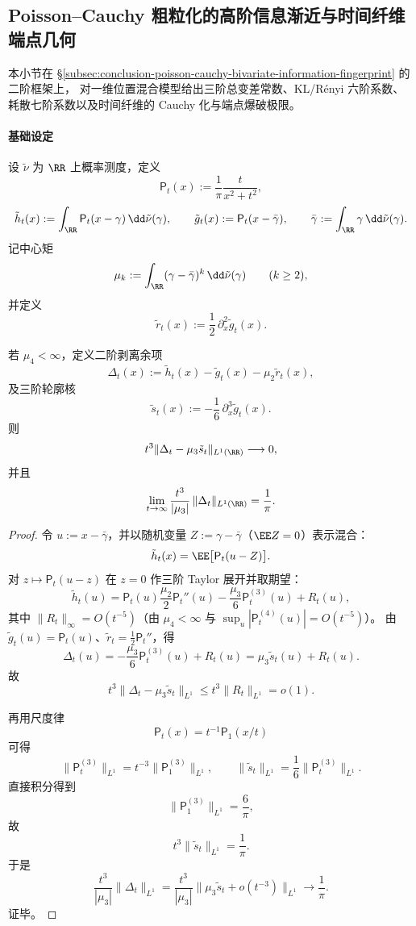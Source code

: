 \subsection{Poisson--Cauchy 粗粒化的高阶信息渐近与时间纤维端点几何}\label{subsec:conclusion-poisson-cauchy-high-order-entropy-fiber-rigidity}
本小节在 \S\ref{subsec:conclusion-poisson-cauchy-bivariate-information-fingerprint} 的二阶框架上，
对一维位置混合模型给出三阶总变差常数、KL/R\'enyi 六阶系数、耗散七阶系数以及时间纤维的 Cauchy 化与端点爆破极限。

\paragraph{基础设定}
设 \(\tilde\nu\) 为 \(\RR\) 上概率测度，定义
\[
\mathsf P_t(x):=\frac1\pi\frac{t}{x^2+t^2},
\]
\[
\tilde h_t(x):=\int_{\RR}\mathsf P_t(x-\gamma)\,\dd\tilde\nu(\gamma),\qquad
\tilde g_t(x):=\mathsf P_t(x-\bar\gamma),\qquad
\bar\gamma:=\int_{\RR}\gamma\,\dd\tilde\nu(\gamma).
\]
记中心矩
\[
\mu_k:=\int_{\RR}(\gamma-\bar\gamma)^k\,\dd\tilde\nu(\gamma)\qquad(k\ge 2),
\]
并定义
\[
\tilde r_t(x):=\frac12\,\partial_x^2\tilde g_t(x).
\]

\begin{theorem}[三阶去方差总变差常数]\label{thm:conclusion-poisson-cauchy-third-order-tv-constant}
若 \(\mu_4<\infty\)，定义二阶剥离余项
\[
\Delta_t(x):=\tilde h_t(x)-\tilde g_t(x)-\mu_2\tilde r_t(x),
\]
及三阶轮廓核
\[
\tilde s_t(x):=-\frac16\,\partial_x^3\tilde g_t(x).
\]
则
\[
t^3\|\Delta_t-\mu_3\tilde s_t\|_{L^1(\RR)}\longrightarrow 0,
\]
并且
\[
\lim_{t\to\infty}\frac{t^3}{|\mu_3|}\,\|\Delta_t\|_{L^1(\RR)}=\frac1\pi.
\]
\end{theorem}
\begin{proof}
令 \(u:=x-\bar\gamma\)，并以随机变量 \(Z:=\gamma-\bar\gamma\)（\(\EE Z=0\)）表示混合：
\[
\tilde h_t(x)=\EE\bigl[\mathsf P_t(u-Z)\bigr].
\]
对 \(z\mapsto \mathsf P_t(u-z)\) 在 \(z=0\) 作三阶 Taylor 展开并取期望：
\[
\tilde h_t(u)
=
\mathsf P_t(u)
\frac{\mu_2}{2}\mathsf P_t''(u)
-\frac{\mu_3}{6}\mathsf P_t^{(3)}(u)
+R_t(u),
\]
其中 \(\|R_t\|_\infty=O(t^{-5})\)（由 \(\mu_4<\infty\) 与 \(\sup_u|\mathsf P_t^{(4)}(u)|=O(t^{-5})\)）。
由 \(\tilde g_t(u)=\mathsf P_t(u)\)、\(\tilde r_t=\frac12\mathsf P_t''\)，得
\[
\Delta_t(u)= -\frac{\mu_3}{6}\mathsf P_t^{(3)}(u)+R_t(u)=\mu_3\tilde s_t(u)+R_t(u).
\]
故
\[
t^3\|\Delta_t-\mu_3\tilde s_t\|_{L^1}\le t^3\|R_t\|_{L^1}=o(1).
\]

再用尺度律
\[
\mathsf P_t(x)=t^{-1}\mathsf P_1(x/t)
\]
可得
\[
\|\mathsf P_t^{(3)}\|_{L^1}=t^{-3}\|\mathsf P_1^{(3)}\|_{L^1},
\qquad
\|\tilde s_t\|_{L^1}=\frac16\|\mathsf P_t^{(3)}\|_{L^1}.
\]
直接积分得到
\[
\|\mathsf P_1^{(3)}\|_{L^1}=\frac6\pi,
\]
故
\[
t^3\|\tilde s_t\|_{L^1}=\frac1\pi.
\]
于是
\[
\frac{t^3}{|\mu_3|}\|\Delta_t\|_{L^1}
=
\frac{t^3}{|\mu_3|}\|\mu_3\tilde s_t+o(t^{-3})\|_{L^1}
\longrightarrow
\frac1\pi.
\]
证毕。
\end{proof}

